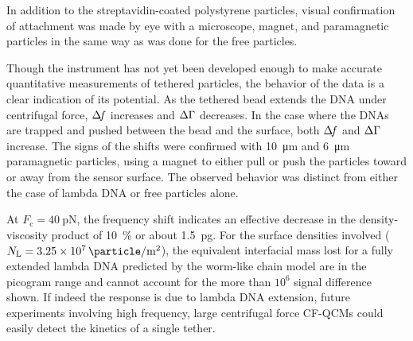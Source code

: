 In addition to the streptavidin-coated polystyrene particles, visual
confirmation of attachment was made by eye with a microscope, magnet, and
paramagnetic particles in the same way as was done for the free particles.

Though the instrument has not yet been developed enough to make accurate
quantitative measurements of tethered particles, the behavior of the data
is a clear indication of its potential.  As the tethered bead extends the
DNA under centrifugal force, $\Delta\!f$ increases and $\Delta\Gamma$ decreases.  In the
case where the DNAs are trapped and pushed between the bead and the
surface, both $\Delta\!f$ and $\Delta\Gamma$ increase.  The signs of the shifts were
confirmed with \SI{10}{\micro\meter} and \SI{6}{\micro\meter} paramagnetic
particles, using a magnet to either pull or push the particles toward or
away from the sensor surface.  The observed behavior  was distinct from
either the case of lambda DNA or free particles alone.

At $F_\mathrm{c}=\SI{40}{\pico\newton}$, the frequency shift indicates an
effective decrease in the density-viscosity product of \SI{10}{\percent} or
about \SI{1.5}{\pico\gram}.  For the surface densities involved
($N_\mathrm{L}=\SI{3.25e7}{\particle\per\meter\squared}$), the equivalent
interfacial mass lost for a fully extended lambda DNA predicted by the
worm-like chain model are in the picogram range and cannot account for the
more than $10^6$ signal difference shown.  If indeed the response is due to
lambda DNA extension, future experiments involving high frequency, large
centrifugal force CF-QCMs could easily detect the kinetics of a single
tether.

